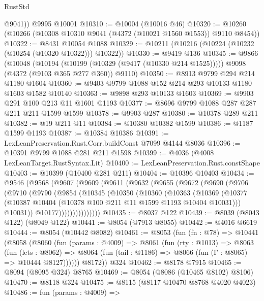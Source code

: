 \begin{lexlean}{RustStd}
\begin{coremodule}
        @9041))
    @9995
    @10001
@10310 := @10004 (@10016 @46)
@10320 := @10260 (@10266 (@10308 @10310 @9041 (@4372 (@10021 @1560 @1553)) @9110 @8454))
@10322 := @8431 @10054 @1088
@10329 := @10211 (@10216 (@10224 (@10232 (@10254 (@10320 @10322))) @10322))
@10330 := @9419 @136
@10345 := @9866
    (@10048
      (@10194 (@10199 (@10329 (@9417 (@10330 @214 @1525)))))
      @9098
      (@4372 (@9103 @365 @277 @360))
      @9110)
@10350 := @8913 @9799 @294 @214 @1180 @1604
@10360 := @9403 @9799 @1088 @152 @214 @293 @10133 @1180 @1603 @1582 @10140
@10363 := @9898 @293 @10133 @1603
@10369 := @9903 @291 @100 @213 @11 @1601 @1193
@10377 := @8696 @9799 @1088 @287 @287 @211 @211 @1599 @1599
@10378 := @9903 @287
@10380 := @10378 @289 @211
@10382 := @19 @211 @11
@10384 := @10380 @10382 @1599
@10386 := @1187 @1599 @1193
@10387 := @10384 @10386
@10391 := LexLeanPreservation.Rust.Corr.buildConst @7099 @4144 @8036
@10396 := @10391 @9799 @1088 @281 @211 @1598
@10399 := @4036 (@4008 LexLeanTarget.RustSyntax.Lit)
@10400 := LexLeanPreservation.Rust.constShape
@10403 := @10399 (@10400 @281 @211)
@10404 := @10396 @10403
@10434 := @9546
    (@9568
      (@9607
        (@9609
          (@9611
            (@9632
              (@9655
                (@9672
                  (@9690
                    (@9706
                      (@9710
                        (@9790
                          (@9854
                            (@10345
                              (@10350
                                (@10360
                                  (@10363
                                    (@10369
                                      (@10377
                                        (@10387
                                          @10404
                                          (@10378 @100 @211 @11 @1599 @1193 @10404 @10031)))
                                      @10031))
                                  @10177)))))))))))))))
@10435 := @8037 @122
@10439 := @8039 (@8043 @122) (@8049 @122)
@10441 := @8054 (@7913 @8055)
@10442 := @4016 @6619
@10444 := @8054 (@10442 @8082)
@10461 := @8053
    (fun (fn : @78) =>
    @10441
      (@8058
        (@8060
          (fun (params : @4009) =>
          @8061
            (fun (rty : @1013) =>
            @8063
              (fun (lets : @8062) =>
              @8064 (fun (tail : @1186) => @8066 (fun (Γ : @8065) => @10444 @8127))))))
        @8172))
    @324
@10462 := @8178 @7915
@10465 := @8094 (@8095 @324) @8765
@10469 := @8054 (@8086 (@10465 @8102) @8106)
@10470 := @8118 @324
@10475 := @8115 (@8117 @10470 @8768 @4020 @4023)
@10486 := fun (params : @4009) =>

\end{coremodule}
\end{lexlean}
